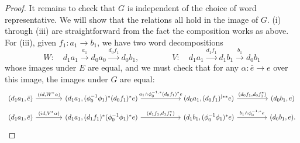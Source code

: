 \documentclass[a4paper,10pt
,draft
]{article}%
\renewcommand{\1}{\eta}%
\begin{document}
\begin{proof}
      It remains to check that $G$ is independent of the choice of word representative. We will show that the relations all hold in the image of $G$.
      (i) through (iii) are straightforward from the fact the composition works as above.
      For (iii), given $f_1: a_1 \to b_1$, we have two word decompositions
      \begin{equation}
            W:
            \quad 
            d_1 a_1 \xrightarrow{a_1} d_0 a_0 \xrightarrow{d_0 f_1} d_0 b_1,
            \qquad \qquad
            V:
            \quad
            d_1 a_1 \xrightarrow{d_1 f_1} d_1 b_1 \xrightarrow{b_1} d_0 b_1
      \end{equation}
      whose images under $E$ are equal, and we must check that for any $\alpha: \bar e \to e$ over this image,
      the images under $G$ are equal:
      \begin{equation}
            \label{IMUG_EQ}
            \begin{tikzcd}[row sep = small]
                  (d_1 a_1, \bar e) \arrow[r, "{(id, W^{\**}\alpha)}"]
                  &[15pt]
                  (d_1 a_1, (\phi_0^{-1}\phi_1)^{\**} (d_0f_1)^{\**} e) \arrow[r, "{a_1 \wedge \phi_0^{-1,\**} (d_0 f_1)^{\**} e}"]
                  &[35pt]
                  (d_0 a_1, (d_0 f_1)^{|**} e) \arrow[r, "{(d_0f_1, d_0 f_1^{\**})}"]
                  &[20pt]
                  (d_0 b_1, e)
                  \\
                  (d_1 a_1, \bar e) \arrow[r, "{(id, V^{\**}\alpha)}"]
                  &
                  (d_1 a_1, (d_1f_1)^{\**} (\phi_0^{-1} \phi_1)^{\**} e) \arrow[r, "{(d_1 f_1, d_1 f_1^{\**})}"]
                  &
                  (d_1 b_1, (\phi_0^{-1} \phi_1)^{\**} e) \arrow[r, "{b_1 \wedge \phi_0^{-1, \**} e}"]
                  &
                  (d_0 b_1, e).
            \end{tikzcd}
      \end{equation}


\end{proof}
\end{document}
